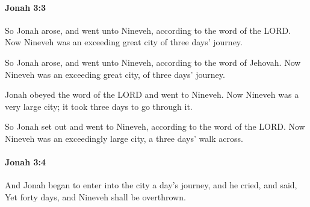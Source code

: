 		\paragraph{Jonah 3:3} %
			\label{JONAH-3-3}

			So Jonah arose, and went unto Nineveh, according to the word of the LORD. Now Nineveh was an exceeding great city of three days’ journey.

			\begin{versebox}
					\item[BHS] 
					\item[LXX] 
					\item[ASV] So Jonah arose, and went unto Nineveh, according to the word of Jehovah. Now Nineveh was an exceeding great city, of three days' journey.
					\item[NIV] Jonah obeyed the word of the LORD and went to Nineveh. Now Nineveh was a very large city; it took three days to go through it.
					\item[NRSV] So Jonah set out and went to Nineveh, according to the word of the LORD. Now Nineveh was an exceedingly large city, a three days’ walk across.
			\end{versebox}

		\paragraph{Jonah 3:4} %
			\label{JONAH-3-4}

			And Jonah began to enter into the city a day’s journey, and he cried, and said, Yet forty days, and Nineveh shall be overthrown.

